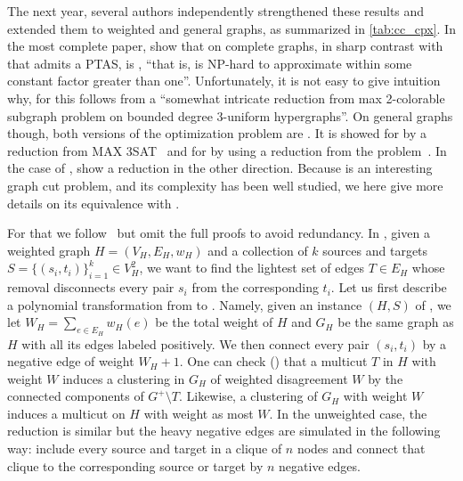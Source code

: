 The next year, several authors independently strengthened these results and extended them to
weighted and general graphs, as summarized in \autoref{tab:cc_cpx}. In the most complete paper,
\textcite{Charikar2003} show that on complete graphs, in sharp contrast with \maxa{} that admits a
PTAS, \mind{} is \APXh{}, \enquote{that is, is NP-hard to approximate within some constant factor
greater than one}. Unfortunately, it is not easy to give intuition why, for this follows from a
\enquote{somewhat intricate reduction from max 2-colorable subgraph problem on bounded degree
3-uniform hypergraphs}. On general graphs though, both versions of the optimization problem are
\APXh{}. It is showed for \maxa{} by a reduction from MAX 3SAT~\autocite[Theorem 9]{Charikar2003}
and for \mind{} by using a reduction from the \mmc{} problem~\autocite[Theorem 8]{Charikar2003}. In
the case of \mind{}, \textcite{Emanuel2003} show a reduction in the other direction. Because \mmc{}
is an interesting graph cut problem, and its complexity has been well studied, we here give more
details on its equivalence with \pcc{}.

For that we follow~\autocite{Demaine2006} but omit the full proofs to avoid redundancy. In \mmc{},
given a weighted graph $H=(V_H, E_H, w_H)$ and a collection of $k$ sources and targets
$S=\{(s_i,t_i)\}_{i=1}^k \in V_H^2$, we want to find the lightest set of edges $T\in E_H$
whose removal disconnects every pair $s_i$ from the corresponding $t_i$. Let us first describe a
polynomial transformation from \mmc{} to \pcc{}. Namely, given an instance $(H, S)$ of \mmc{}, we let
$W_H=\sum_{e\in E_H} w_H(e)$ be the total weight of $H$ and $G_H$ be the same graph as $H$ with all
its edges labeled positively. We then connect every pair $(s_i, t_i)$ by a negative edge of weight
$W_H+1$. One can check (\autocite[Theorem 4.7]{Demaine2006}) that a multicut $T$ in $H$ with weight
$W$ induces a clustering in $G_H$ of weighted disagreement $W$ by the connected components of
$G^+\setminus T$. Likewise, a clustering of $G_H$ with weight $W$ induces a multicut on $H$ with
weight as most $W$. In the unweighted case, the reduction is similar but the heavy negative edges
are simulated in the following way: include every source and target in a clique of $n$ nodes and
connect that clique to the corresponding source or target by $n$ negative edges.

